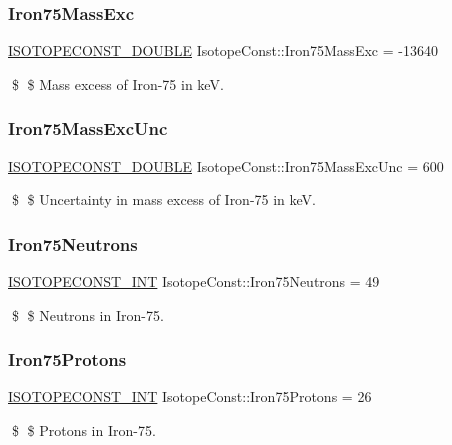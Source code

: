 \subsubsection{\texorpdfstring{Iron75\+Mass\+Exc}{Iron75MassExc}}
{\footnotesize\ttfamily \mbox{\hyperlink{group___isotope_const-_macros_ga8f45a7272ce02c0b4c65c44636ed719a}{I\+S\+O\+T\+O\+P\+E\+C\+O\+N\+S\+T\+\_\+\+D\+O\+U\+B\+LE}} Isotope\+Const\+::\+Iron75\+Mass\+Exc = -\/13640}

\$ \$ Mass excess of Iron-\/75 in keV. \mbox{\label{group___isotope_const-_iron-_fe75_gad0661b11314a119fefeed637998b19c0}} 
\subsubsection{\texorpdfstring{Iron75\+Mass\+Exc\+Unc}{Iron75MassExcUnc}}
{\footnotesize\ttfamily \mbox{\hyperlink{group___isotope_const-_macros_ga8f45a7272ce02c0b4c65c44636ed719a}{I\+S\+O\+T\+O\+P\+E\+C\+O\+N\+S\+T\+\_\+\+D\+O\+U\+B\+LE}} Isotope\+Const\+::\+Iron75\+Mass\+Exc\+Unc = 600}

\$ \$ Uncertainty in mass excess of Iron-\/75 in keV. \mbox{\label{group___isotope_const-_iron-_fe75_ga8a5c7fd98e736a04e68ddca183419b58}} 
\subsubsection{\texorpdfstring{Iron75\+Neutrons}{Iron75Neutrons}}
{\footnotesize\ttfamily \mbox{\hyperlink{group___isotope_const-_macros_ga5f18360b3e99483a35c32d789e62621c}{I\+S\+O\+T\+O\+P\+E\+C\+O\+N\+S\+T\+\_\+\+I\+NT}} Isotope\+Const\+::\+Iron75\+Neutrons = 49}

\$ \$ Neutrons in Iron-\/75. \mbox{\label{group___isotope_const-_iron-_fe75_gaca44ca66a0c2b97aab34b405572ccab2}} 
\subsubsection{\texorpdfstring{Iron75\+Protons}{Iron75Protons}}
{\footnotesize\ttfamily \mbox{\hyperlink{group___isotope_const-_macros_ga5f18360b3e99483a35c32d789e62621c}{I\+S\+O\+T\+O\+P\+E\+C\+O\+N\+S\+T\+\_\+\+I\+NT}} Isotope\+Const\+::\+Iron75\+Protons = 26}

\$ \$ Protons in Iron-\/75. 
